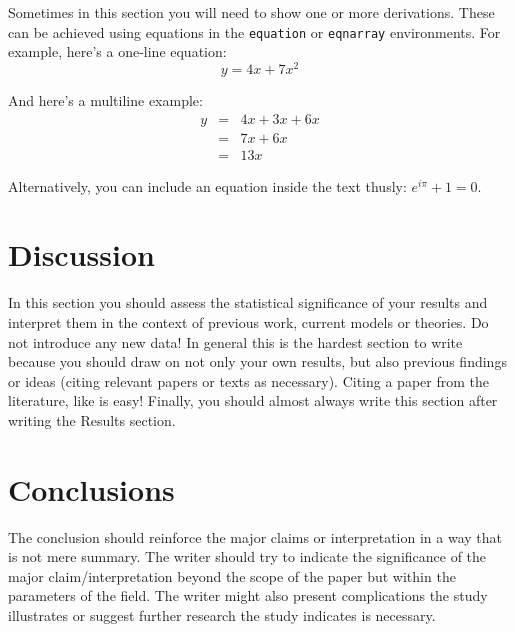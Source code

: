 \documentclass{revtex4}
\begin{document}
Sometimes in this section you will need to show one or more derivations. These can be achieved using equations in the {\tt equation} or {\tt eqnarray} environments. For example, here's a one-line equation:
\begin{equation}
y = 4x + 7x^{2}
\end{equation}

\noindent And here's a multiline example:
\begin{eqnarray}
y & = & 4x + 3x + 6x \\
  & = & 7x + 6x \\
  & = & 13x
\end{eqnarray}

\noindent Alternatively, you can include an equation inside the text thusly: $e^{i\pi} + 1 = 0$.

\section{Discussion}

In this section you should assess the statistical significance of your results and interpret them in the context of previous work, current models or theories. Do not introduce any new data! In general this is the hardest section to write because you should draw on not only your own results, but also previous findings or ideas (citing relevant papers or texts as necessary). Citing a paper from the literature, like \citet{feynman69a} is easy!  Finally, you should almost always write this section after writing the Results section.

\section{Conclusions}

The conclusion should reinforce the major claims or interpretation in a way that is not mere summary. The writer should try to indicate the significance of the major claim/interpretation beyond the scope of the paper but within the parameters of the field. The writer might also present complications the study illustrates or suggest further research the study indicates is necessary.


\end{document}
